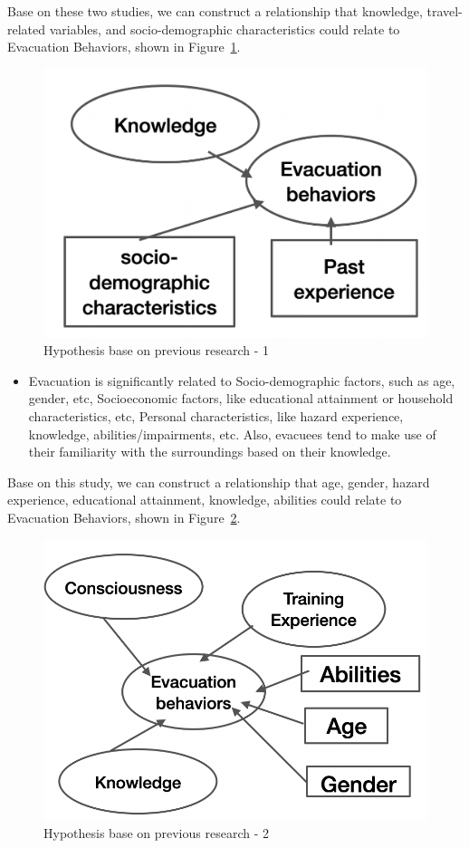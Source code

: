 Base on these two studies, we can construct a relationship that knowledge, travel-related variables, and socio-demographic characteristics could relate to Evacuation Behaviors, shown in Figure~\ref{fig7}. 

\begin{figure}[h]
  \includegraphics[width=0.5\linewidth]{Figure/Figure7.png}
  \centering
  \caption{Hypothesis base on previous research - 1 }
  \label{fig7}
\end{figure}

\begin{itemize}
\item Evacuation is significantly related to Socio-demographic factors, such as age, gender, etc, Socioeconomic factors, like educational attainment or household characteristics, etc, Personal characteristics, like hazard experience, knowledge, abilities/impairments, etc. Also, evacuees tend to make use of their familiarity with the surroundings based on their knowledge.~\cite{Wang2021IncorporatingHF}
\end{itemize}

Base on this study, we can construct a relationship that age, gender, hazard experience,  educational attainment, knowledge, abilities could relate to Evacuation Behaviors, shown in Figure~\ref{fig8}. 

\begin{figure}[h]
  \includegraphics[width=0.5\linewidth]{Figure/Figure8.png}
  \centering
  \caption{Hypothesis base on previous research - 2 }
  \label{fig8}
\end{figure}

